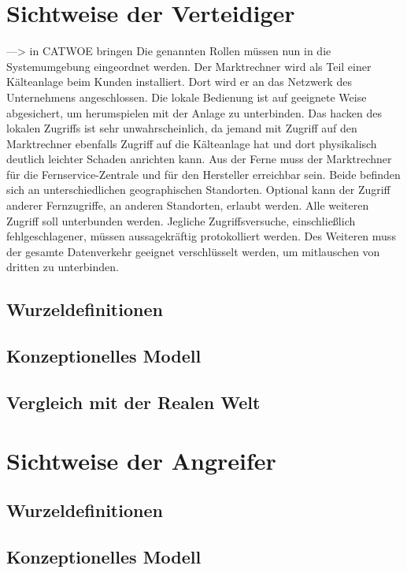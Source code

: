 \documentclass[11pt,a4paper]{report}
\begin{document}
\section{Sichtweise der Verteidiger} 

---> in CATWOE bringen
Die genannten Rollen müssen nun in die Systemumgebung eingeordnet werden. Der Marktrechner wird als Teil einer Kälteanlage beim Kunden installiert. Dort wird er an das Netzwerk des Unternehmens angeschlossen. Die lokale Bedienung ist auf geeignete Weise abgesichert, um herumspielen mit der Anlage zu unterbinden. Das hacken des lokalen Zugriffs ist sehr unwahrscheinlich, da jemand mit Zugriff auf den Marktrechner ebenfalls Zugriff auf die Kälteanlage hat und dort physikalisch deutlich leichter Schaden anrichten kann. Aus der Ferne muss der Marktrechner für die Fernservice-Zentrale und für den Hersteller erreichbar sein. Beide befinden sich an unterschiedlichen geographischen Standorten. Optional kann der Zugriff anderer Fernzugriffe, an anderen Standorten, erlaubt werden. Alle weiteren Zugriff soll unterbunden werden. Jegliche Zugriffsversuche, einschließlich fehlgeschlagener, müssen aussagekräftig protokolliert werden. Des Weiteren muss der gesamte Datenverkehr geeignet verschlüsselt werden, um mitlauschen von dritten zu unterbinden.

\subsection{Wurzeldefinitionen}

\subsection{Konzeptionelles Modell}

\subsection{Vergleich mit der Realen Welt}

\section{Sichtweise der Angreifer}

\subsection{Wurzeldefinitionen}

\subsection{Konzeptionelles Modell}
\end{document}
